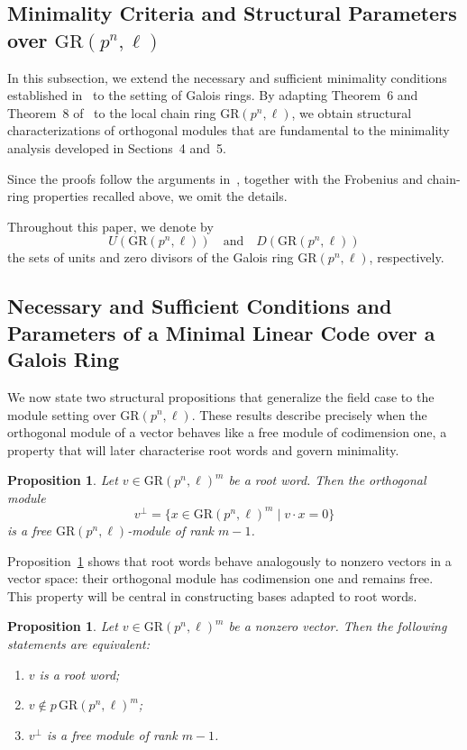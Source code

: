 \documentclass[10pt]{article}
\newtheorem{prop}[lem]{Proposition}
\theoremstyle{definition}
\begin{document}
\subsection{Minimality Criteria and Structural Parameters over $\mathrm{GR}(p^{n},\ell)$}

In this subsection, we extend the necessary and sufficient minimality conditions established in~\cite{ChatterjeeMesnager} to the setting of Galois rings.
By adapting Theorem~6 and Theorem~8 of~\cite{ChatterjeeMesnager} to the local chain ring $\mathrm{GR}(p^{n},\ell)$, we obtain structural characterizations of orthogonal modules that are fundamental to the minimality analysis developed in Sections~4 and~5.

Since the proofs follow the arguments in~\cite{ChatterjeeMesnager}, together with the Frobenius and chain-ring properties recalled above, we omit the details.

Throughout this paper, we denote by
\[
U(\mathrm{GR}(p^{n},\ell))
\quad \text{and} \quad
D(\mathrm{GR}(p^{n},\ell))
\]
the sets of units and zero divisors of the Galois ring $\mathrm{GR}(p^{n},\ell)$, respectively.

\subsection{Necessary and Sufficient Conditions and Parameters of a Minimal Linear Code over a Galois Ring}

We now state two structural propositions that generalize the field case to the module setting over $\mathrm{GR}(p^{n},\ell)$.
These results describe precisely when the orthogonal module of a vector behaves like a free module of codimension one, a property that will later characterise root words and govern minimality.

\begin{prop}\label{Proposition 9}
Let $v \in \mathrm{GR}(p^{n},\ell)^{m}$ be a root word.
Then the orthogonal module
\[
v^{\perp}
=
\{x \in \mathrm{GR}(p^{n},\ell)^{m} \mid v\cdot x = 0\}
\]
is a free $\mathrm{GR}(p^{n},\ell)$-module of rank $m-1$.
\end{prop}

\medskip

Proposition~\ref{Proposition 9} shows that root words behave analogously to nonzero vectors in a vector space:
their orthogonal module has codimension one and remains free.
This property will be central in constructing bases adapted to root words.

\begin{prop}\label{Proposition 9bis}
Let $v \in \mathrm{GR}(p^{n},\ell)^{m}$ be a nonzero vector.
Then the following statements are equivalent:
\begin{enumerate}
    \item $v$ is a root word;
    \item $v \notin p\,\mathrm{GR}(p^{n},\ell)^{m}$;
    \item $v^{\perp}$ is a free module of rank $m-1$.
\end{enumerate}
\end{prop}
\end{document}
